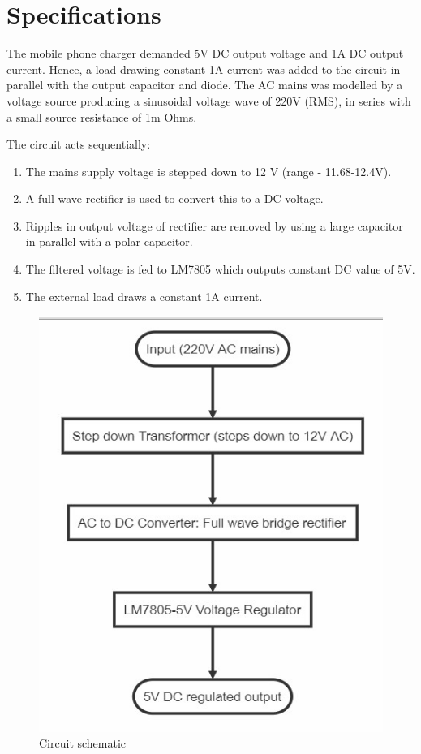 \documentclass{article}
\begin{document}
\section{Specifications}

The mobile phone charger demanded 5V DC output voltage and 1A DC output current. Hence, a load drawing constant 1A current was added to the circuit in parallel with the output capacitor and diode. The AC mains was modelled by a voltage source producing a sinusoidal voltage wave of 220V (RMS), in series with a small source resistance of 1m Ohms. 

The circuit acts sequentially:
\begin{enumerate}
    \item The mains supply voltage is stepped down to 12 V (range - 11.68-12.4V).
    \item A full-wave rectifier is used to convert this to a DC voltage.
    \item Ripples in output voltage of rectifier are removed by using a large capacitor in parallel with a polar capacitor.
    \item The filtered voltage is fed to LM7805\cite{noauthor_what_nodate}\cite{noauthor_buck_nodate} which outputs constant DC value of 5V.
    \item The external load draws a constant 1A current.
\end{enumerate}

\begin{figure}[h!]
\centerline{\includegraphics[scale=.55]{Images/flowchart.jpg}}
\caption{Circuit schematic}
\label{figb}
\end{figure}
\end{document}
